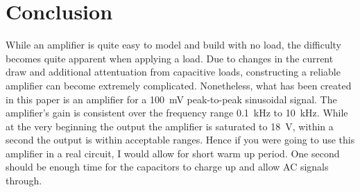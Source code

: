 \documentclass[journal]{IEEEtran}
\begin{document}
%





\section{Conclusion}

While an amplifier is quite easy to model and build with no load, the difficulty becomes quite apparent when applying a load. Due to changes in the current draw and additional attentuation from capacitive loads, constructing a reliable amplifier can become extremely complicated. Nonetheless, what has been created in this paper is an amplifier for a \SI{100}{\milli\volt} peak-to-peak sinusoidal signal. The amplifier's gain is consistent over the frequency range \SI{0.1}{\kilo\hertz} to \SI{10}{\kilo\hertz}. While at the very beginning the output the amplifier is saturated to \SI{18}{\volt}, within a second the output is within acceptable ranges. Hence if you were going to use this amplifier in a real circuit, I would allow for short warm up period. One second should be enough time for the capacitors to charge up and allow AC signals through.
\end{document}
